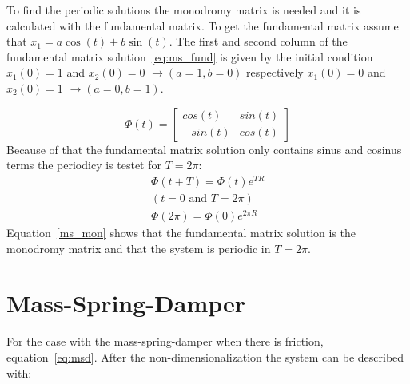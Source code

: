 \documentclass[
  twoside,
  11pt, a4paper,
  footinclude=true,
  headinclude=true,
  cleardoublepage=empty
]{scrbook}
\begin{document}
To find the periodic solutions the monodromy matrix is needed and it is calculated with the fundamental matrix. To get the fundamental matrix assume that $x_1=a\cos(t)+b\sin(t)$.  The first and second column of the fundamental matrix solution~\eqref{eq:ms_fund} is given by the initial condition $x_1(0)=1$ and $x_2(0)=0$ $\rightarrow (a=1, b=0)$ respectively $x_1(0)=0$ and $x_2(0)=1$ $\rightarrow (a=0, b=1)$.

\begin{equation}\label{eq:ms_fund}
	\Phi(t)=\begin{bmatrix}
				cos(t)	&	sin(t)\\
				-sin(t)	&	cos(t)
			\end{bmatrix}
\end{equation} 
Because of that the fundamental matrix solution only contains sinus and cosinus terms the periodicy is testet for $T=2\pi$:
\begin{equation}\label{ms_mon}
	\begin{gathered}
		\Phi(t+T)=\Phi(t) e^{TR}\\
		(t=0\text{ and }T=2\pi)\\
		\Phi(2\pi)=\Phi(0) e^{2\pi R}
	\end{gathered}
\end{equation}
Equation~\eqref{ms_mon} shows that the fundamental matrix solution is the monodromy matrix and that the system is periodic in $T=2\pi$.

\section{Mass-Spring-Damper}
For the case with the mass-spring-damper when there is friction, equation~\eqref{eq:msd}. After the non-dimensionalization the system can be described with:
\end{document}
